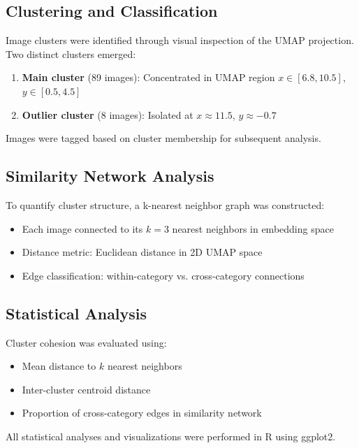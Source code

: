 \subsection{Clustering and Classification}

Image clusters were identified through visual inspection of the UMAP projection. Two distinct clusters emerged:

\begin{enumerate}
    \item \textbf{Main cluster} (89 images): Concentrated in UMAP region $x \in [6.8, 10.5]$, $y \in [0.5, 4.5]$
    \item \textbf{Outlier cluster} (8 images): Isolated at $x \approx 11.5$, $y \approx -0.7$
\end{enumerate}

Images were tagged based on cluster membership for subsequent analysis.

\subsection{Similarity Network Analysis}

To quantify cluster structure, a k-nearest neighbor graph was constructed:

\begin{itemize}
    \item Each image connected to its $k=3$ nearest neighbors in embedding space
    \item Distance metric: Euclidean distance in 2D UMAP space
    \item Edge classification: within-category vs. cross-category connections
\end{itemize}

\subsection{Statistical Analysis}

Cluster cohesion was evaluated using:
\begin{itemize}
    \item Mean distance to $k$ nearest neighbors
    \item Inter-cluster centroid distance
    \item Proportion of cross-category edges in similarity network
\end{itemize}

All statistical analyses and visualizations were performed in R using ggplot2.
